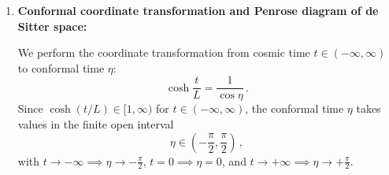 \documentclass[12pt]{article}
\newcommand{\be}{\begin{equation}}
\newcommand{\ee}{\end{equation}}
\begin{document}
\begin{enumerate}[label=\alph*)]
The causal structure of a spacetime is defined by the light cones at every point---that is, by the partitioning of tangent vectors $V^\mu$ (and smooth curves $x^\mu(\lambda)$ with tangent $V^\mu = \frac{dx^\mu}{d\lambda}$) into timelike, null (lightlike), and spacelike categories.

Suppose $g_{\mu\nu}(x) = \Omega^2(x) \bar{g}_{\mu\nu}(x)$, where $\Omega(x)$ is a smooth, strictly non-vanishing function, so that $\Omega^2(x) > 0$ everywhere. For any tangent vector $V^\mu$, its norm squared in the two metrics is related by:
\be
g_{\mu\nu} V^\mu V^\nu = \Omega^2 \bar{g}_{\mu\nu} V^\mu V^\nu \qquad \left(\text{equivalently, } ds^2 = \Omega^2 d\bar{s}^2\right) \,.
\ee
Because $\Omega^2 > 0$ is strictly positive, multiplication by $\Omega^2$ preserves the sign (and zeros) of the quadratic form at every point:
\begin{itemize}
\item \textbf{Timelike:} $g_{\mu\nu} V^\mu V^\nu < 0 \iff \bar{g}_{\mu\nu} V^\mu V^\nu < 0$,
\item \textbf{Null (lightlike):} $g_{\mu\nu} V^\mu V^\nu = 0 \iff \bar{g}_{\mu\nu} V^\mu V^\nu = 0$,
\item \textbf{Spacelike:} $g_{\mu\nu} V^\mu V^\nu > 0 \iff \bar{g}_{\mu\nu} V^\mu V^\nu > 0$.
\end{itemize}
Thus, the light cones (and hence all timelike, null, and spacelike curves, as well as causal future/past relations between events) of $g_{\mu\nu}$ and $\bar{g}_{\mu\nu}$ are identical. Consequently, $g_{\mu\nu}$ and $\bar{g}_{\mu\nu}$ have the exact same causal structure.

\item \textbf{Conformal coordinate transformation and Penrose diagram of de Sitter space:}

We perform the coordinate transformation from cosmic time $t \in (-\infty, \infty)$ to conformal time $\eta$:
\be
\cosh \frac{t}{L} = \frac{1}{\cos \eta} \,.
\label{eq:eta_def}
\ee
Since $\cosh(t/L) \in [1, \infty)$ for $t \in (-\infty, \infty)$, the conformal time $\eta$ takes values in the finite open interval
\be
\eta \in \left( -\frac{\pi}{2}, \frac{\pi}{2} \right) \,,
\ee
with $t \to -\infty \implies \eta \to -\frac{\pi}{2}$, $t = 0 \implies \eta = 0$, and $t \to +\infty \implies \eta \to +\frac{\pi}{2}$.


\end{enumerate}
\end{document}
